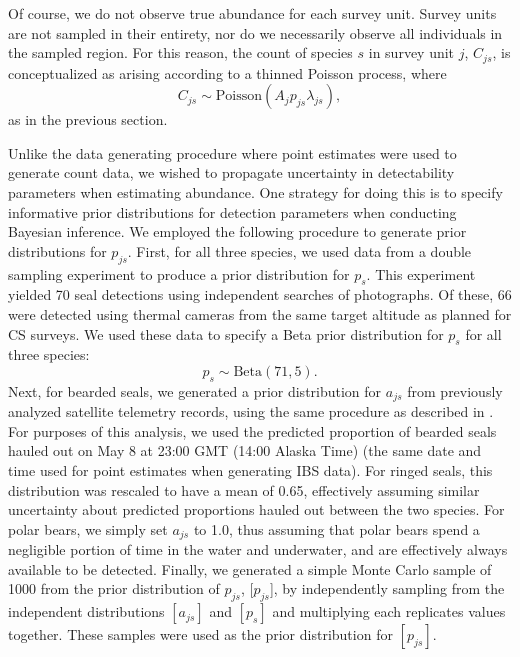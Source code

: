 \documentclass[]{rsos}%
\begin{document}
Of course, we do not observe true abundance for each survey unit. Survey units are not sampled in their entirety, nor do we necessarily observe all individuals in the sampled region.  For this reason, the count of species $s$ in survey unit $j$, $C_{js}$, is conceptualized as arising according to a thinned Poisson process, where
\begin{equation*}
 C_{js} \sim \textrm{Poisson}(A_j p_{js} \lambda_{js}),
\end{equation*}
as in the previous section.

Unlike the data generating procedure where point estimates were used to generate count data, we wished to propagate uncertainty in detectability parameters when estimating abundance.  One strategy for doing this is to specify informative prior distributions for detection parameters when conducting Bayesian inference.  We employed the following procedure to generate prior distributions for $p_{js}$.  First, for all three species, we used data from a double sampling experiment \cite{ConnEtAl2014} to produce a prior distribution for $p_s$.  This experiment yielded 70 seal detections using independent searches of photographs. Of these, 66 were detected using thermal cameras from the same target altitude as planned for CS surveys.  We used these data to specify a Beta prior distribution for $p_s$ for all three species:
\begin{equation*}
  p_s \sim \text{Beta}(71,5).
\end{equation*}
Next, for bearded seals, we generated a prior distribution for $a_{js}$ from previously analyzed satellite telemetry records, using the same procedure as described in \cite{ConnEtAl2014}.  For purposes of this analysis, we used the predicted proportion of bearded seals hauled out on May 8 at 23:00 GMT (14:00 Alaska Time) (the same date and time used for point estimates when generating IBS data).  For ringed seals, this distribution was rescaled to have a mean of 0.65, effectively assuming similar uncertainty about predicted proportions hauled out between the two species.  For polar bears, we simply set $a_{js}$ to 1.0, thus assuming that polar bears spend a negligible portion of time in the water and underwater, and are effectively always available to be detected.  Finally, we generated a simple Monte Carlo sample of 1000 from the prior distribution of $p_{js}$, [$p_{js}$], by independently sampling from the independent distributions $[a_{js}]$ and $[p_s]$ and multiplying each replicates values together.  These samples were used as the prior distribution for $[p_{js}]$.
\end{document}

